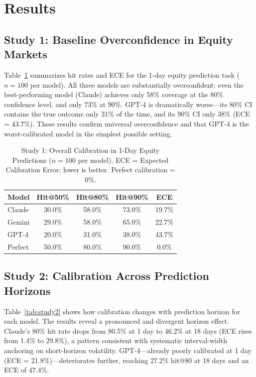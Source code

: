 \section{Results}
\label{sec:results}

\subsection{Study 1: Baseline Overconfidence in Equity Markets}
\label{sec:results-study1}

Table~\ref{tab:study1} summarizes hit rates and ECE for the 1-day equity prediction
task ($n = 100$ per model). All three models are substantially overconfident: even the
best-performing model (Claude) achieves only 58\% coverage at the 80\% confidence
level, and only 73\% at 90\%. GPT-4 is dramatically worse---its 80\% CI contains
the true outcome only 31\% of the time, and its 90\% CI only 38\% (ECE = 43.7\%).
These results confirm universal overconfidence and that GPT-4 is the worst-calibrated
model in the simplest possible setting.

\begin{table}[ht]
  \centering
  \caption{Study 1: Overall Calibration in 1-Day Equity Predictions ($n = 100$ per model).
    ECE = Expected Calibration Error; lower is better. Perfect calibration = 0\%.}
  \label{tab:study1}
  \begin{tabular}{lcccc}
    \toprule
    Model   & Hit@50\% & Hit@80\% & Hit@90\% & ECE    \\
    \midrule
    Claude  & 30.0\%   & 58.0\%   & 73.0\%   & 19.7\% \\
    Gemini  & 29.0\%   & 58.0\%   & 65.0\%   & 22.7\% \\
    GPT-4   & 20.0\%   & 31.0\%   & 38.0\%   & 43.7\% \\
    \midrule
    Perfect & 50.0\%   & 80.0\%   & 90.0\%   & 0.0\%  \\
    \bottomrule
  \end{tabular}
\end{table}

\subsection{Study 2: Calibration Across Prediction Horizons}
\label{sec:results-study2}

Table~\ref{tab:study2} shows how calibration changes with prediction horizon for each
model. The results reveal a pronounced and divergent horizon effect. Claude's 80\% hit
rate drops from 80.5\% at 1 day to 46.2\% at 18 days (ECE rises from 1.4\% to 29.8\%),
a pattern consistent with systematic interval-width anchoring on short-horizon
volatility. GPT-4---already poorly calibrated at 1 day (ECE = 21.8\%)---deteriorates
further, reaching 27.2\% hit@80 at 18 days and an ECE of 47.4\%.

